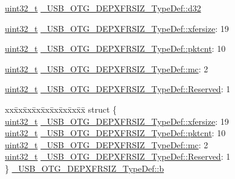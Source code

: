 \begin{DoxyCompactItemize}
\begin{tabbing}
\end{tabbing}\item 
\hyperlink{stdint_8h_a435d1572bf3f880d55459d9805097f62}{uint32\-\_\-t} \hyperlink{group___u_s_b___o_t_g___d_r_i_v_e_r_gaf21925209991fac54719ba1172162a9e}{\-\_\-\-U\-S\-B\-\_\-\-O\-T\-G\-\_\-\-D\-E\-P\-X\-F\-R\-S\-I\-Z\-\_\-\-Type\-Def\-::d32}
\item 
\hyperlink{stdint_8h_a435d1572bf3f880d55459d9805097f62}{uint32\-\_\-t} \hyperlink{group___u_s_b___o_t_g___d_r_i_v_e_r_gacbb83610c76a02a5b5b6eb6660030456}{\-\_\-\-U\-S\-B\-\_\-\-O\-T\-G\-\_\-\-D\-E\-P\-X\-F\-R\-S\-I\-Z\-\_\-\-Type\-Def\-::xfersize}\-: 19
\item 
\hyperlink{stdint_8h_a435d1572bf3f880d55459d9805097f62}{uint32\-\_\-t} \hyperlink{group___u_s_b___o_t_g___d_r_i_v_e_r_ga77695bfee6d56fa56701a78625cf641f}{\-\_\-\-U\-S\-B\-\_\-\-O\-T\-G\-\_\-\-D\-E\-P\-X\-F\-R\-S\-I\-Z\-\_\-\-Type\-Def\-::pktcnt}\-: 10
\item 
\hyperlink{stdint_8h_a435d1572bf3f880d55459d9805097f62}{uint32\-\_\-t} \hyperlink{group___u_s_b___o_t_g___d_r_i_v_e_r_ga706f007f2762f307ff5971d15874422c}{\-\_\-\-U\-S\-B\-\_\-\-O\-T\-G\-\_\-\-D\-E\-P\-X\-F\-R\-S\-I\-Z\-\_\-\-Type\-Def\-::mc}\-: 2
\item 
\hyperlink{stdint_8h_a435d1572bf3f880d55459d9805097f62}{uint32\-\_\-t} \hyperlink{group___u_s_b___o_t_g___d_r_i_v_e_r_gae7b0cc98b67492a7d1b0b798e19b6eeb}{\-\_\-\-U\-S\-B\-\_\-\-O\-T\-G\-\_\-\-D\-E\-P\-X\-F\-R\-S\-I\-Z\-\_\-\-Type\-Def\-::\-Reserved}\-: 1
\item 
\begin{tabbing}
xx\=xx\=xx\=xx\=xx\=xx\=xx\=xx\=xx\=\kill
struct \{\\
\>\hyperlink{stdint_8h_a435d1572bf3f880d55459d9805097f62}{uint32\_t} \hyperlink{group___u_s_b___o_t_g___d_r_i_v_e_r_gacbb83610c76a02a5b5b6eb6660030456}{\_USB\_OTG\_DEPXFRSIZ\_TypeDef::xfersize}: 19\\
\>\hyperlink{stdint_8h_a435d1572bf3f880d55459d9805097f62}{uint32\_t} \hyperlink{group___u_s_b___o_t_g___d_r_i_v_e_r_ga77695bfee6d56fa56701a78625cf641f}{\_USB\_OTG\_DEPXFRSIZ\_TypeDef::pktcnt}: 10\\
\>\hyperlink{stdint_8h_a435d1572bf3f880d55459d9805097f62}{uint32\_t} \hyperlink{group___u_s_b___o_t_g___d_r_i_v_e_r_ga706f007f2762f307ff5971d15874422c}{\_USB\_OTG\_DEPXFRSIZ\_TypeDef::mc}: 2\\
\>\hyperlink{stdint_8h_a435d1572bf3f880d55459d9805097f62}{uint32\_t} \hyperlink{group___u_s_b___o_t_g___d_r_i_v_e_r_gae7b0cc98b67492a7d1b0b798e19b6eeb}{\_USB\_OTG\_DEPXFRSIZ\_TypeDef::Reserved}: 1\\
\} \hyperlink{group___u_s_b___o_t_g___d_r_i_v_e_r_ga786d5ef260b91be9f48665384921db3e}{\_USB\_OTG\_DEPXFRSIZ\_TypeDef::b}\\


\end{tabbing}
\end{DoxyCompactItemize}
